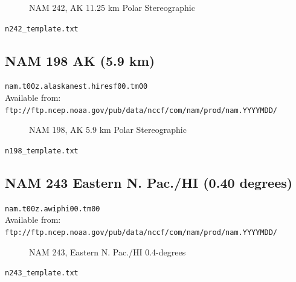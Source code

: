 \documentclass[11pt]{article}   %
\begin{document}
\begin{figure}[htbp]\begin{center}
\parbox{15cm}{\caption{\label{FigNAM242}
NAM 242, AK 11.25 km Polar Stereographic
}}
\end{center}\end{figure}
\clearpage 
\verb|n242_template.txt| \\
\tiny  \normalsize

\clearpage
\subsection{NAM 198 AK (5.9 km)}

\verb|nam.t00z.alaskanest.hiresf00.tm00|\\
Available from:\\
\verb|ftp://ftp.ncep.noaa.gov/pub/data/nccf/com/nam/prod/nam.YYYYMDD/| \\

\begin{figure}[htbp]\begin{center}
\parbox{15cm}{\caption{\label{FigNAM198}
NAM 198, AK 5.9 km Polar Stereographic
}}
\end{center}\end{figure}
\clearpage
\verb|n198_template.txt| \\
\tiny  \normalsize


\clearpage
\subsection{NAM 243 Eastern N. Pac./HI (0.40 degrees)}

\verb|nam.t00z.awiphi00.tm00|\\
Available from:\\
\verb|ftp://ftp.ncep.noaa.gov/pub/data/nccf/com/nam/prod/nam.YYYYMDD/|

\begin{figure}[htbp]\begin{center}
\parbox{15cm}{\caption{\label{FigNAM243}
NAM 243, Eastern N. Pac./HI 0.4-degrees
}}
\end{center}\end{figure}
\clearpage
\verb|n243_template.txt| \\
\tiny  \normalsize
\end{document}
